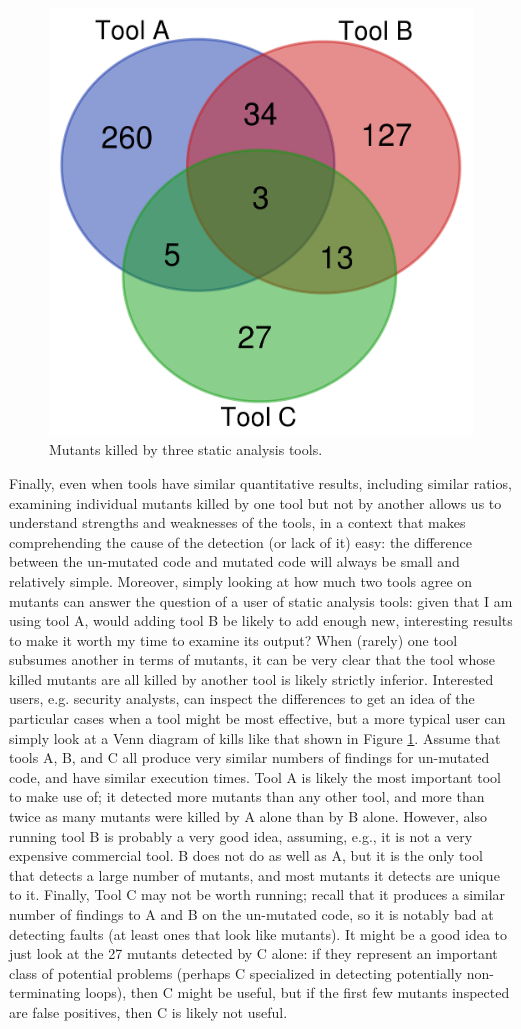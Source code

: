 \begin{figure}
  \includegraphics[width=0.5\columnwidth]{example.png}
  \caption{Mutants killed by three static analysis tools.}
  \label{fig:examplevenn}
\end{figure}

Finally, even when tools have similar quantitative results, including similar ratios, examining individual mutants killed by one tool but not by another allows us to understand strengths and weaknesses of the tools, in a context that makes comprehending the cause of the detection (or lack of it) easy: the difference between the un-mutated code and mutated code will always be small and relatively simple.  Moreover, simply looking at how much two tools agree on mutants can answer the question of a user of static analysis tools: given that I am using tool A, would adding tool B be likely to add enough new, interesting results to make it worth my time to examine its output?  When (rarely) one tool subsumes another in terms of mutants, it can be very clear that the tool whose killed mutants are all killed by another tool is likely strictly inferior.  Interested users, e.g. security analysts, can inspect the differences to get an idea of the particular cases when a tool might be most effective, but a more typical user can simply look at a Venn diagram of kills like that shown in Figure \ref{fig:examplevenn}.  Assume that tools A, B, and C all produce very similar numbers of findings for un-mutated code, and have similar execution times.  Tool A is likely the most important tool to make use of; it detected more mutants than any other tool, and more than twice as many mutants were killed by A alone than by B alone.  However, also running tool B is probably a very good idea, assuming, e.g., it is not a very expensive commercial tool.  B does not do as well as A, but it is the only tool that detects a large number of mutants, and most mutants it detects are unique to it.  Finally, Tool C may not be worth running; recall that it produces a similar number of findings to A and B on the un-mutated code, so it is notably bad at detecting faults (at least ones that look like mutants).  It might be a good idea to just look at the 27 mutants detected by C alone:  if they represent an important class of potential problems (perhaps C specialized in detecting potentially non-terminating loops), then C might be useful, but if the first few mutants inspected are false positives, then C is likely not useful.

